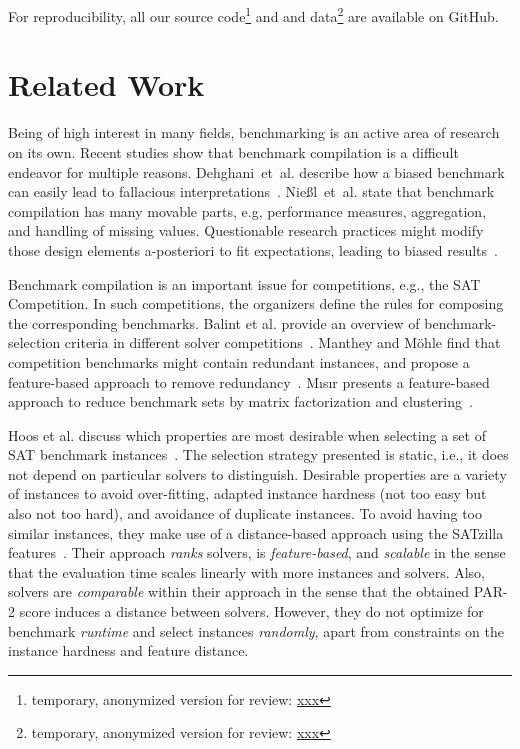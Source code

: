 \documentclass[runningheads]{llncs}
\begin{document}
For reproducibility, all our source code\footnote{temporary, anonymized version for review: \url{xxx}} and and data\footnote{temporary, anonymized version for review: \url{xxx}} are available on GitHub.


\section{Related Work}

Being of high interest in many fields, benchmarking is an active area of research on its own. 
Recent studies show that benchmark compilation is a difficult endeavor for multiple reasons.
Dehghani~et~al. describe how a biased benchmark can easily lead to fallacious interpretations~\cite{abs-2107-07002}.
Nießl~et~al. state that benchmark compilation has many movable parts, e.g, performance measures, aggregation, and handling of missing values.
Questionable research practices might modify those design elements a-posteriori to fit expectations, leading to biased results~\cite{NiesslHWCB22}.

Benchmark compilation is an important issue for competitions, e.g., the SAT Competition.
In such competitions, the organizers define the rules for composing the corresponding benchmarks.
Balint et al. provide an overview of benchmark-selection criteria in different solver competitions~\cite{balint2015overview}.
Manthey and Möhle find that competition benchmarks might contain redundant instances, and propose a feature-based approach to remove redundancy~\cite{manthey2016better}.
M{\i}s{\i}r presents a feature-based approach to reduce benchmark sets by matrix factorization and clustering~\cite{misir2021benchmark}.

Hoos et al. discuss which properties are most desirable when selecting a set of SAT benchmark instances~\cite{HoosKSS13}.
The selection strategy presented is static, i.e., it does not depend on particular solvers to distinguish.
Desirable properties are a variety of instances to avoid over-fitting, adapted instance hardness (not too easy but also not too hard), and avoidance of duplicate instances.
To avoid having too similar instances, they make use of a distance-based approach using the SATzilla features~\cite{XuHHL08,features}.
Their approach \emph{ranks} solvers, is \emph{feature-based}, and \emph{scalable} in the sense that the evaluation time scales linearly with more instances and solvers.
Also, solvers are \emph{comparable} within their approach in the sense that the obtained PAR-2 score induces a distance between solvers.
However, they do not optimize for benchmark \emph{runtime} and select instances \emph{randomly}, apart from constraints on the instance hardness and feature distance.
\end{document}
